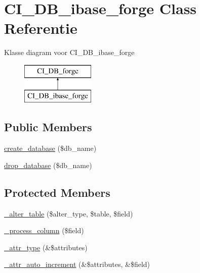 \hypertarget{class_c_i___d_b__ibase__forge}{}\section{C\+I\+\_\+\+D\+B\+\_\+ibase\+\_\+forge Class Referentie}
\label{class_c_i___d_b__ibase__forge}
Klasse diagram voor C\+I\+\_\+\+D\+B\+\_\+ibase\+\_\+forge\begin{figure}[H]
\begin{center}
\leavevmode
\includegraphics[height=2.000000cm]{class_c_i___d_b__ibase__forge}
\end{center}
\end{figure}
\subsection*{Public Members}
\begin{DoxyCompactItemize}
\item 
\mbox{\hyperlink{class_c_i___d_b__ibase__forge_a902a7267babceb2ce595706f217e00ad}{create\+\_\+database}} (\$db\+\_\+name)
\item 
\mbox{\hyperlink{class_c_i___d_b__ibase__forge_a9612987b2d4230de2638d15857e92e67}{drop\+\_\+database}} (\$db\+\_\+name)
\end{DoxyCompactItemize}
\subsection*{Protected Members}
\begin{DoxyCompactItemize}
\item 
\mbox{\hyperlink{class_c_i___d_b__ibase__forge_a41c6cae02f2fda8b429ad0afb9509426}{\+\_\+alter\+\_\+table}} (\$alter\+\_\+type, \$table, \$field)
\item 
\mbox{\hyperlink{class_c_i___d_b__ibase__forge_a8f38f1c5b5dddecca4befbe393f3f299}{\+\_\+process\+\_\+column}} (\$field)
\item 
\mbox{\hyperlink{class_c_i___d_b__ibase__forge_a8553be952084c6f7cdfff370a1d14f6b}{\+\_\+attr\+\_\+type}} (\&\$attributes)
\item 
\mbox{\hyperlink{class_c_i___d_b__ibase__forge_a2a013a5932439c3c44f0dad3436525f7}{\+\_\+attr\+\_\+auto\+\_\+increment}} (\&\$attributes, \&\$field)
\end{DoxyCompactItemize}
